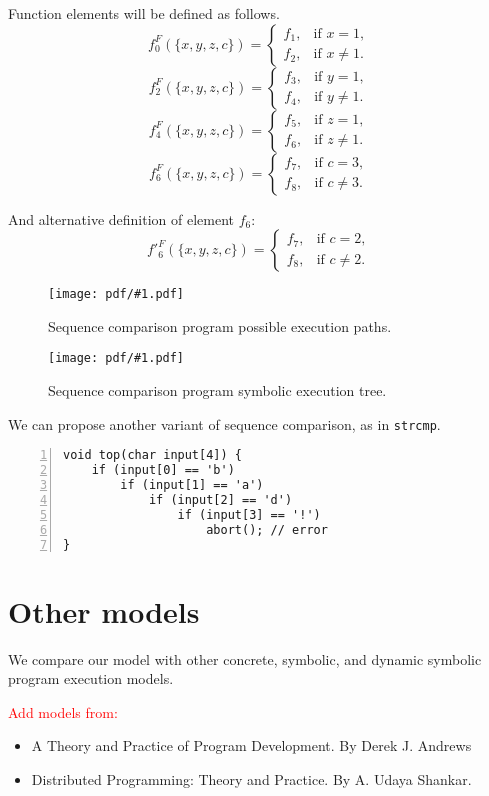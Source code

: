 \documentclass[oneside,a4paper]{article}  %
\newcommand{\level}{\section}
\newcommand{\note}[1]{\textcolor{red}{#1}}
\newcommand{\centerimage}[2]{
\begin{figure}[h!]
    \begin{center}
        \texttt{[image: pdf/\#1.pdf]}
        \caption{#2}
    \end{center}
    \label{img:#1}
\end{figure}
}
\begin{document}
Function elements will be defined as follows.
\[ f_0^F(\{x, y, z, c\}) =
    \begin{cases}
        f_1, & \text{if }x = 1, \\
        f_2, & \text{if }x \neq 1.
    \end{cases} \]
\[ f_2^F(\{x, y, z, c\}) =
    \begin{cases}
        f_3, & \text{if }y = 1, \\
        f_4, & \text{if }y \neq 1.
    \end{cases} \]
\[ f_4^F(\{x, y, z, c\}) =
    \begin{cases}
        f_5, & \text{if }z = 1, \\
        f_6, & \text{if }z \neq 1.
    \end{cases} \]
\[ f_6^F(\{x, y, z, c\}) =
    \begin{cases}
        f_7, & \text{if }c = 3, \\
        f_8, & \text{if }c \neq 3.
    \end{cases} \]

And alternative definition of element $f_6$:
\[ f'_6^F(\{x, y, z, c\}) =
    \begin{cases}
        f_7, & \text{if }c = 2, \\
        f_8, & \text{if }c \neq 2.
    \end{cases} \]

\centerimage{classic_paths}
    {Sequence comparison program possible execution paths.}

\centerimage{classic_symbolic_tree}
    {Sequence comparison program symbolic execution tree.}

We can propose another variant of sequence comparison, as in \texttt{strcmp}.
\begin{lstlisting}[numbers=left,numberstyle=\scriptsize]
void top(char input[4]) {
    if (input[0] == 'b')
        if (input[1] == 'a')
            if (input[2] == 'd')
                if (input[3] == '!')
                    abort(); // error
}
\end{lstlisting}

\level{Other models}

We compare our model with other concrete, symbolic, and dynamic symbolic
program execution models.

\note{Add models from:}
\begin{itemize}
    \item A Theory and Practice of Program Development.
        By Derek J. Andrews
    \item Distributed Programming: Theory and Practice.
        By A. Udaya Shankar.
\end{itemize}
\end{document}
